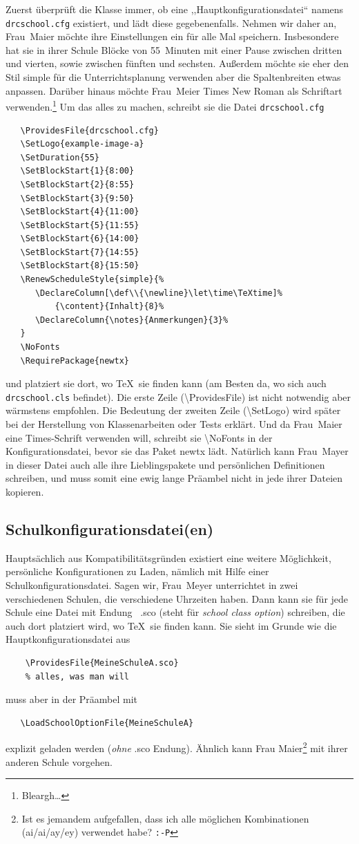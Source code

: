 \documentclass[hyperworksheet,pgfplots]{drcschool}
\newcommand*{\cs}[1]{\textup{\ttfamily\textbackslash#1}}                   %
\newcommand*{\pkg}[1]{\textup{\ttfamily#1}}                                %
\newcommand*{\opt}[1]{\textup{\ttfamily#1}}                                %
\begin{document}
Zuerst überprüft die Klasse immer, ob eine ,,Hauptkonfigurationsdatei`` namens
\texttt{drcschool.cfg} existiert, und lädt diese gegebenenfalls.
Nehmen wir daher an, Frau~Maier möchte ihre Einstellungen ein für alle Mal speichern.
Insbesondere hat sie in ihrer Schule Blöcke von 55~Minuten mit einer Pause zwischen
dritten und vierten, sowie zwischen fünften und sechsten. Außerdem möchte sie
eher den Stil \opt{simple} für die Unterrichtsplanung verwenden aber die Spaltenbreiten
etwas anpassen. Darüber hinaus möchte Frau~Meier
Times New Roman als Schriftart verwenden.\footnote{Bleargh\ldots}
Um das alles zu machen, schreibt sie die Datei \texttt{drcschool.cfg}
\begin{verbatim}
   \ProvidesFile{drcschool.cfg}
   \SetLogo{example-image-a}
   \SetDuration{55}
   \SetBlockStart{1}{8:00}
   \SetBlockStart{2}{8:55}
   \SetBlockStart{3}{9:50}
   \SetBlockStart{4}{11:00}
   \SetBlockStart{5}{11:55}
   \SetBlockStart{6}{14:00}
   \SetBlockStart{7}{14:55}
   \SetBlockStart{8}{15:50}
   \RenewScheduleStyle{simple}{%
      \DeclareColumn[\def\\{\newline}\let\time\TeXtime]%
          {\content}{Inhalt}{8}%
      \DeclareColumn{\notes}{Anmerkungen}{3}%
   }
   \NoFonts
   \RequirePackage{newtx}
\end{verbatim}
und platziert sie dort, wo \TeX\ sie finden kann
(am Besten da, wo sich auch \texttt{drcschool.cls} befindet).
Die erste Zeile (\cs{ProvidesFile}) ist nicht notwendig aber wärmstens empfohlen.
Die Bedeutung der zweiten Zeile (\cs{SetLogo}) wird später bei der Herstellung
von Klassenarbeiten oder Tests erklärt. Und da Frau~Maier eine Times-Schrift
verwenden will, schreibt sie \cs{NoFonts} in der Konfigurationsdatei, bevor sie
das Paket \pkg{newtx} lädt. Natürlich kann Frau~Mayer
in dieser Datei auch alle ihre Lieblingspakete und persönlichen Definitionen
schreiben, und muss somit eine ewig lange Präambel nicht in jede ihrer Dateien
kopieren.

\subsection{Schulkonfigurationsdatei(en)}
Hauptsächlich aus Kompatibilitätsgründen existiert eine weitere Möglichkeit,
persönliche Konfigurationen zu Laden, nämlich mit Hilfe einer
Schulkonfigurationsdatei. Sagen wir, Frau~Meyer unterrichtet in zwei verschiedenen
Schulen, die verschiedene Uhrzeiten haben. Dann kann sie für jede Schule eine
Datei mit Endung ~\opt{.sco} (steht für \emph{school class option}) schreiben,
die auch dort platziert wird, wo \TeX\ sie finden kann. Sie sieht im Grunde
wie die Hauptkonfigurationsdatei aus
\begin{verbatim}
    \ProvidesFile{MeineSchuleA.sco}
    % alles, was man will
\end{verbatim}
muss aber in der Präambel mit
\begin{verbatim}
   \LoadSchoolOptionFile{MeineSchuleA}
\end{verbatim}
explizit geladen werden (\emph{ohne} \opt{.sco} Endung). Ähnlich
kann Frau Maier\footnote{Ist es jemandem aufgefallen, dass ich alle möglichen Kombinationen (ai/ai/ay/ey) verwendet habe? \texttt{:-P}}
mit ihrer anderen Schule vorgehen.
\end{document}
